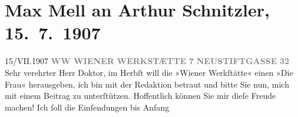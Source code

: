 

         
         \renewcommand{\erwaehntePersonen}{Personen: Josef Hoffmann, Max Mell, Maria Mell, Olga Schnitzler, Friedrich Wärndorfer}
         \renewcommand{\erwaehnteInstitutionen}{Institutionen: Wiener Werkstätte}
         \renewcommand{\erwaehnteOrte}{Orte: Neustiftgasse, Ungarn, VII., Neubau, Wien, Wittelsbachstraße}
         \renewcommand{\erwaehnteWerke}{Werke: Almanach der Wiener Werkstätte}
               \section[Max Mell an Arthur Schnitzler, 15. 7. 1907]{ Max Mell an Arthur Schnitzler, 15. 7. 1907}\nopagebreak{}\rehead{ }\begin{ledgroupsized}[t]{13cm}\normalsize\beginnumbering \toendnotes[C]{\smallbreak\pagebreak[2]} 
\toendnotes[C]{\smallbreak}\pstart
           \noindent{}{\pb}15/VII.\hfill 1907\pend
           \pstart
           \centering{}\textcolor{gray}{\textbf{WW WIENER}}\pend
           \pstart
           \noindent{}\centering{}\textcolor{gray}{\textbf{WERKSTÆTTE}}\pend
           \pstart
           \noindent{}\centering{}\textcolor{gray}{\textbf{7}}\pend
           \pstart
           \noindent{}\centering{}\textcolor{gray}{\textbf{NEUSTIFTGASSE}}\pend
           \pstart
           \noindent{}\centering{}\textcolor{gray}{\textbf{32}}\pend
           \pstart{}Sehr verehrter Herr Doktor,\pend\pstart
           im Herbſt will die »Wiener Werkſtätte« einen
                  \label{K_L01692-1v}\label{K_L01692-1h} »Die Frau« herausgeben, ich bin mit der
               Redaktion betraut und bitte Sie nun, mich mit einem Beitrag zu unterſtützen.
               Hoffentlich können Sie mir dieſe Freude machen! Ich ſoll die Einſendungen bis Anfang

\end{ledgroupsized}
